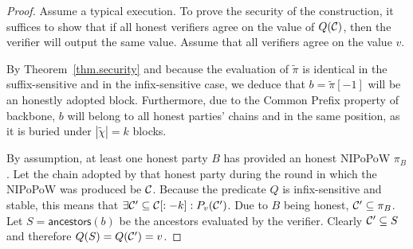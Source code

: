 \begin{proof}
Assume a typical execution. To prove the security of the construction, it
suffices to show that if all honest verifiers agree on the value of $Q(\mathcal{C})$,
then the verifier will output the same value. Assume that all verifiers agree on
the value $v$.

By Theorem~\ref{thm.security} and because the evaluation of $\tilde\pi$ is
identical in the suffix-sensitive and in the infix-sensitive case, we deduce
that $b = \tilde\pi[-1]$ will be an honestly adopted block. Furthermore, due to
the Common Prefix property of backbone, $b$ will belong to all honest parties'
chains and in the same position, as it is buried under $|\tilde\chi| = k$
blocks.

By assumption, at least one honest party $B$ has provided an honest NIPoPoW
$\pi_B$. Let the chain adopted by that honest party during the round in which
the NIPoPoW was produced be $\mathcal{C}$. Because the predicate $Q$ is infix-sensitive
and stable, this means that $\exists \mathcal{C}' \subseteq \mathcal{C}[:-k]:
P_v(\mathcal{C}')$. Due to $B$ being honest, $\mathcal{C}' \subseteq \pi_B$. Let
$S = \textsf{ancestors}(b)$ be the ancestors evaluated by the verifier. Clearly
$\mathcal{C}' \subseteq S$ and therefore $Q(S) = Q(\mathcal{C}') = v$.
\Qed
\end{proof}
